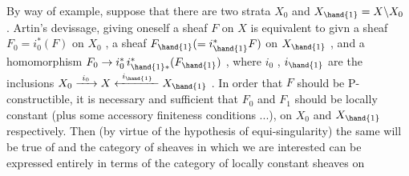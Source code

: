   By way of example, suppose that there are  two  strata\hand{,}  $X_0$\hand{,} and
$X_{\hand{1}} = X\backslash X_0$ .   Artin's devissage, giving oneself a sheaf $F$ on $X$ is
equivalent to  givn a sheaf $F_0 = i^*_0(F)$ on $X_0$ , a sheaf $F_{\hand{1}}(= i^*_{\hand{1}}F)$
on $X_{\hand{1}}$ , and a homomorphism $F_0 \to i^*_0\, i^*_{\hand{1}*}(F_{\hand{1}})$ , where $i_0$ , $i_{\hand{1}}$ are the
inclusions $X_0 \xrightarrow{\ i_0\ } X \xleftarrow{\ i_{\hand{1}}\ } X_{\hand{1}}$ . In order that $F$ should be P-constructible, it
is necessary and sufficient that $F_0$ and $F_1$ should be locally constant
(plus some accessory finiteness conditions ...), on $X_0$ and $X_{\hand{1}}$ respectively.
Then (by virtue of the hypothesis of equi-singularity) the same will be true
of   and the category of sheaves in which we are interested can be
expressed entirely in terms of the category of locally constant sheaves on

